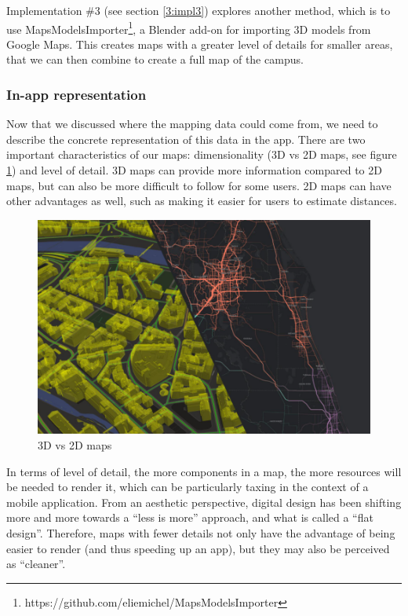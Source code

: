             Implementation \#3 (see section \ref{3:impl3}) explores another method, which is to use MapsModelsImporter\footnote{https://github.com/eliemichel/MapsModelsImporter}, a Blender add-on for importing 3D models from Google Maps. This creates maps with a greater level of details for smaller areas, that we can then combine to create a full map of the campus.
            
        \subsubsection{In-app representation}
        
            Now that we discussed where the mapping data could come from, we need to describe the concrete representation of this data in the app. There are two important characteristics of our maps: dimensionality (3D vs 2D maps, see figure \ref{3:fig:3dvs2dmaps}) and level of detail. 3D maps can provide more information compared to 2D maps, but can also be more difficult to follow for some users. 2D maps can have other advantages as well, such as making it easier for users to estimate distances\cite{harrower2020to3d}.
            
            \begin{figure}[ht]
                \centering
                \includegraphics[width=\textwidth]{figures/3dvs2dmap.png}
                \caption{3D vs 2D maps}
                \label{3:fig:3dvs2dmaps}
            \end{figure}
            
            In terms of level of detail, the more components in a map, the more resources will be needed to render it, which can be particularly taxing in the context of a mobile application. From an aesthetic perspective, digital design has been shifting more and more towards a “less is more” approach, and what is called a “flat design”. Therefore, maps with fewer details not only have the advantage of being easier to render (and thus speeding up an app), but they may also be perceived as “cleaner”.
            
